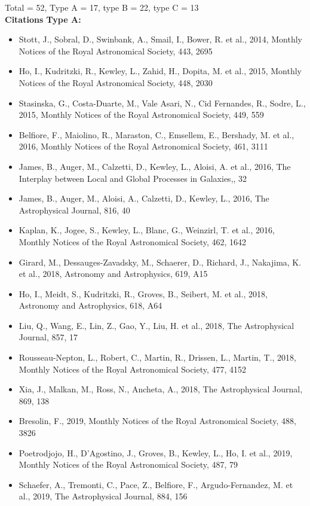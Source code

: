 \documentclass{letter}
\begin{document}
\begin{enumerate}
Total = 52, Type A = 17, type B = 22, type C = 13 \\ 
{\bf Citations Type A:}
\begin{itemize}
\item Stott, J., Sobral, D., Swinbank, A., Smail, I., Bower, R. et al., 2014, Monthly Notices of the Royal Astronomical Society, 443, 2695
\item Ho, I., Kudritzki, R., Kewley, L., Zahid, H., Dopita, M. et al., 2015, Monthly Notices of the Royal Astronomical Society, 448, 2030
\item Stasinska, G., Costa-Duarte, M., Vale Asari, N., Cid Fernandes, R., Sodre, L., 2015, Monthly Notices of the Royal Astronomical Society, 449, 559
\item Belfiore, F., Maiolino, R., Maraston, C., Emsellem, E., Bershady, M. et al., 2016, Monthly Notices of the Royal Astronomical Society, 461, 3111
\item James, B., Auger, M., Calzetti, D., Kewley, L., Aloisi, A. et al., 2016, The Interplay between Local and Global Processes in Galaxies,, 32
\item James, B., Auger, M., Aloisi, A., Calzetti, D., Kewley, L., 2016, The Astrophysical Journal, 816, 40
\item Kaplan, K., Jogee, S., Kewley, L., Blanc, G., Weinzirl, T. et al., 2016, Monthly Notices of the Royal Astronomical Society, 462, 1642
\item Girard, M., Dessauges-Zavadsky, M., Schaerer, D., Richard, J., Nakajima, K. et al., 2018, Astronomy and Astrophysics, 619, A15
\item Ho, I., Meidt, S., Kudritzki, R., Groves, B., Seibert, M. et al., 2018, Astronomy and Astrophysics, 618, A64
\item Liu, Q., Wang, E., Lin, Z., Gao, Y., Liu, H. et al., 2018, The Astrophysical Journal, 857, 17
\item Rousseau-Nepton, L., Robert, C., Martin, R., Drissen, L., Martin, T., 2018, Monthly Notices of the Royal Astronomical Society, 477, 4152
\item Xia, J., Malkan, M., Ross, N., Ancheta, A., 2018, The Astrophysical Journal, 869, 138
\item Bresolin, F., 2019, Monthly Notices of the Royal Astronomical Society, 488, 3826
\item Poetrodjojo, H., D'Agostino, J., Groves, B., Kewley, L., Ho, I. et al., 2019, Monthly Notices of the Royal Astronomical Society, 487, 79
\item Schaefer, A., Tremonti, C., Pace, Z., Belfiore, F., Argudo-Fernandez, M. et al., 2019, The Astrophysical Journal, 884, 156

\end{itemize}
\end{enumerate}
\end{document}
